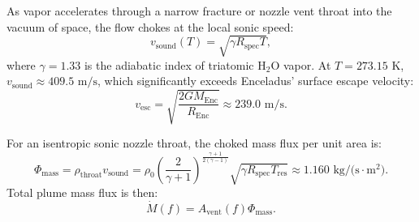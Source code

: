 \documentclass[11pt,a4paper]{article}
\begin{document}
As vapor accelerates through a narrow fracture or nozzle vent throat into the vacuum of space, the flow chokes at the local sonic speed:
\begin{equation}
v_{\mathrm{sound}}(T) = \sqrt{\gamma R_{\mathrm{spec}} T},
\end{equation}
where $\gamma = 1.33$ is the adiabatic index of triatomic $\text{H}_2\text{O}$ vapor. At $T = 273.15\text{ K}$, $v_{\mathrm{sound}} \approx 409.5\text{ m/s}$, which significantly exceeds Enceladus' surface escape velocity:
\begin{equation}
v_{\mathrm{esc}} = \sqrt{\frac{2 G M_{\mathrm{Enc}}}{R_{\mathrm{Enc}}}} \approx 239.0\text{ m/s}.
\end{equation}

For an isentropic sonic nozzle throat, the choked mass flux per unit area is:
\begin{equation}
\Phi_{\mathrm{mass}} = \rho_{\mathrm{throat}} v_{\mathrm{sound}} = \rho_0 \left( \frac{2}{\gamma + 1} \right)^{\frac{\gamma + 1}{2(\gamma - 1)}} \sqrt{\gamma R_{\mathrm{spec}} T_{\mathrm{res}}} \approx 1.160\text{ kg/(s}\cdot\text{m}^2).
\end{equation}
Total plume mass flux is then:
\begin{equation}
\dot{M}(f) = A_{\mathrm{vent}}(f) \Phi_{\mathrm{mass}}.
\end{equation}
\end{document}
